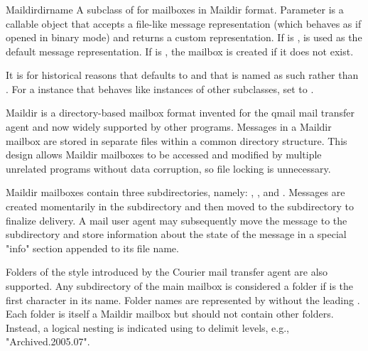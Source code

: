 \subsubsection{}
\label{mailbox-maildir}

\begin{classdesc}{Maildir}{dirname}
A subclass of  for mailboxes in Maildir format. Parameter
 is a callable object that accepts a file-like message
representation (which behaves as if opened in binary mode) and returns a custom
representation. If  is ,  is used
as the default message representation. If  is , the
mailbox is created if it does not exist.

It is for historical reasons that  defaults to
 and that  is named as such rather than
. For a  instance that behaves like instances of other
 subclasses, set  to .
\end{classdesc}

Maildir is a directory-based mailbox format invented for the qmail mail
transfer agent and now widely supported by other programs. Messages in a
Maildir mailbox are stored in separate files within a common directory
structure. This design allows Maildir mailboxes to be accessed and modified by
multiple unrelated programs without data corruption, so file locking is
unnecessary.

Maildir mailboxes contain three subdirectories, namely: , ,
and . Messages are created momentarily in the  subdirectory
and then moved to the  subdirectory to finalize delivery. A mail user
agent may subsequently move the message to the  subdirectory and
store information about the state of the message in a special "info" section
appended to its file name.

Folders of the style introduced by the Courier mail transfer agent are also
supported. Any subdirectory of the main mailbox is considered a folder if
 is the first character in its name. Folder names are represented
by  without the leading . Each folder is itself a
Maildir mailbox but should not contain other folders. Instead, a logical
nesting is indicated using  to delimit levels, e.g.,
"Archived.2005.07".

